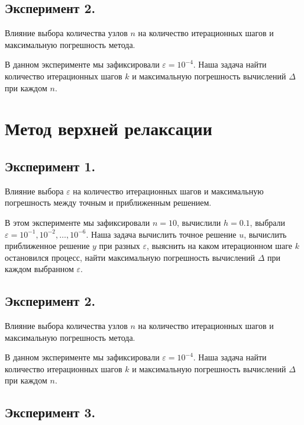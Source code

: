 

\section{Эксперимент 2.}

Влияние выбора количества узлов $n$ на количество итерационных шагов и максимальную погрешность метода.

В данном эксперименте мы зафиксировали $\varepsilon = 10^{-4}$. Наша задача найти количество итерационных шагов $k$ и максимальную погрешность вычислений $\Delta$ при каждом $n$.



\chapter{Метод верхней релаксации}

\section{Эксперимент 1.}

Влияние выбора $\varepsilon$ на количество итерационных шагов и максимальную погрешность между точным и приближенным решением.

В этом эксперименте мы зафиксировали $n = 10$, вычислили $h=0.1$, выбрали $\varepsilon = 10^{-1}, 10^{-2}, \dots, 10^{-6}$. Наша задача вычислить точное решение $u$, вычислить приближенное решение $y$ при разных $\varepsilon$, выяснить на каком итерационном шаге $k$  остановился процесс, найти максимальную погрешность вычислений $\Delta$ при каждом выбранном $\varepsilon$.



\section{Эксперимент 2.}

Влияние выбора количества узлов $n$ на количество итерационных шагов и максимальную погрешность метода.

В данном эксперименте мы зафиксировали $\varepsilon = 10^{-4}$. Наша задача найти количество итерационных шагов $k$ и максимальную погрешность вычислений $\Delta$ при каждом $n$.



\section{Эксперимент 3.}

